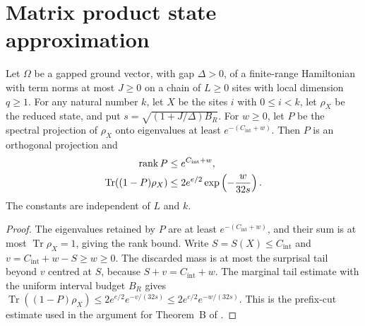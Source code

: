 \section{Matrix product state approximation}

\begin{lemma}
    \label{thm:chain_prefix_spectral_bounds}
    \leanok
    Let $\Omega$ be a gapped ground vector, with gap $\Delta>0$, of a
    finite-range Hamiltonian with term norms at most $J\ge0$ on a chain of
    $L\ge0$ sites with local dimension $q\ge1$.
    For any natural number $k$, let $X$ be the sites $i$ with $0\le i<k$,
    let $\rho_X$ be the reduced state, and put
    $s=\sqrt{(1+J/\Delta)B_R}$.
    For $w\ge0$, let $P$ be the spectral projection of $\rho_X$ onto
    eigenvalues at least $e^{-(C_{\mathrm{int}}+w)}$. Then $P$ is an
    orthogonal projection and
    \begin{align}
        \operatorname{rank}P
         & \le e^{C_{\mathrm{int}}+w}, \notag                  \\
        \operatorname{Tr}((1-P)\rho_X)
         & \le 2e^{e/2}\exp\left(-\frac{w}{32s}\right). \notag
    \end{align}
    The constants are independent of $L$ and $k$.
\end{lemma}
\begin{proof}
    \leanok
    The eigenvalues retained by $P$ are at least
    $e^{-(C_{\mathrm{int}}+w)}$, and their sum is at most
    $\operatorname{Tr}\rho_X=1$, giving the rank bound.
    Write $S=S(X)\le C_{\mathrm{int}}$ and
    $v=C_{\mathrm{int}}+w-S\ge w\ge0$.
    The discarded mass is at most the surprisal tail beyond $v$ centred
    at $S$, because $S+v=C_{\mathrm{int}}+w$.
    The marginal tail estimate with the uniform interval budget $B_R$ gives
    $\operatorname{Tr}((1-P)\rho_X)\le2e^{e/2}e^{-v/(32s)}
        \le2e^{e/2}e^{-w/(32s)}$.
    This is the prefix-cut estimate used in the argument for Theorem~B
    of \cite[Part~IIa]{TNLean2026OneDimensional}.
\end{proof}

